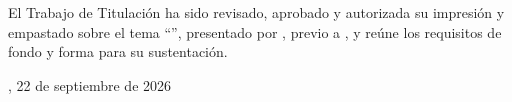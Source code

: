 
El Trabajo de Titulación ha sido revisado, aprobado y autorizada su impresión y empastado sobre el tema ``\UTITituloProyectoMayusculas'', presentado por \UTIAutoresTexto, previo a \UTIFraseObtencionTituloProfesional{}, y reúne los requisitos de fondo y forma para su sustentación.

\vspace{1.5cm}
\UTICiudadPais, 22 de septiembre de 2026
\vspace{2.5cm}

\UTILectoresFirmaBloque